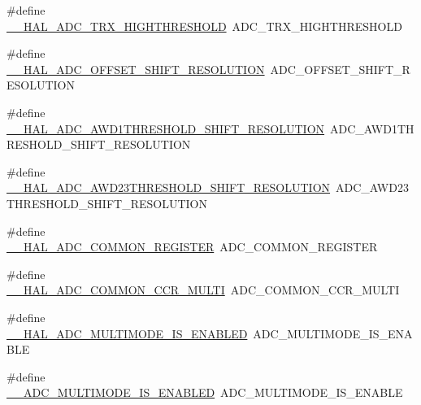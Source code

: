 \begin{DoxyCompactItemize}
\item 
\#define \hyperlink{group___h_a_l___a_d_c___aliased___macros_ga33afa59f288d4671512aed3dfb8f70b7}{\+\_\+\+\_\+\+H\+A\+L\+\_\+\+A\+D\+C\+\_\+\+T\+R\+X\+\_\+\+H\+I\+G\+H\+T\+H\+R\+E\+S\+H\+O\+LD}~A\+D\+C\+\_\+\+T\+R\+X\+\_\+\+H\+I\+G\+H\+T\+H\+R\+E\+S\+H\+O\+LD
\item 
\#define \hyperlink{group___h_a_l___a_d_c___aliased___macros_ga0f83fc077ad488745139c8e24641d437}{\+\_\+\+\_\+\+H\+A\+L\+\_\+\+A\+D\+C\+\_\+\+O\+F\+F\+S\+E\+T\+\_\+\+S\+H\+I\+F\+T\+\_\+\+R\+E\+S\+O\+L\+U\+T\+I\+ON}~A\+D\+C\+\_\+\+O\+F\+F\+S\+E\+T\+\_\+\+S\+H\+I\+F\+T\+\_\+\+R\+E\+S\+O\+L\+U\+T\+I\+ON
\item 
\#define \hyperlink{group___h_a_l___a_d_c___aliased___macros_ga616002cefa3a1ba7af4fa612afd02561}{\+\_\+\+\_\+\+H\+A\+L\+\_\+\+A\+D\+C\+\_\+\+A\+W\+D1\+T\+H\+R\+E\+S\+H\+O\+L\+D\+\_\+\+S\+H\+I\+F\+T\+\_\+\+R\+E\+S\+O\+L\+U\+T\+I\+ON}~A\+D\+C\+\_\+\+A\+W\+D1\+T\+H\+R\+E\+S\+H\+O\+L\+D\+\_\+\+S\+H\+I\+F\+T\+\_\+\+R\+E\+S\+O\+L\+U\+T\+I\+ON
\item 
\#define \hyperlink{group___h_a_l___a_d_c___aliased___macros_ga4038d6abc1b95e035a2a0b51fb999db2}{\+\_\+\+\_\+\+H\+A\+L\+\_\+\+A\+D\+C\+\_\+\+A\+W\+D23\+T\+H\+R\+E\+S\+H\+O\+L\+D\+\_\+\+S\+H\+I\+F\+T\+\_\+\+R\+E\+S\+O\+L\+U\+T\+I\+ON}~A\+D\+C\+\_\+\+A\+W\+D23\+T\+H\+R\+E\+S\+H\+O\+L\+D\+\_\+\+S\+H\+I\+F\+T\+\_\+\+R\+E\+S\+O\+L\+U\+T\+I\+ON
\item 
\#define \hyperlink{group___h_a_l___a_d_c___aliased___macros_ga00ebbedf4015e4538720e7a6dbacce59}{\+\_\+\+\_\+\+H\+A\+L\+\_\+\+A\+D\+C\+\_\+\+C\+O\+M\+M\+O\+N\+\_\+\+R\+E\+G\+I\+S\+T\+ER}~A\+D\+C\+\_\+\+C\+O\+M\+M\+O\+N\+\_\+\+R\+E\+G\+I\+S\+T\+ER
\item 
\#define \hyperlink{group___h_a_l___a_d_c___aliased___macros_ga8bf50f7c58849d4cd141a421d55b148d}{\+\_\+\+\_\+\+H\+A\+L\+\_\+\+A\+D\+C\+\_\+\+C\+O\+M\+M\+O\+N\+\_\+\+C\+C\+R\+\_\+\+M\+U\+L\+TI}~A\+D\+C\+\_\+\+C\+O\+M\+M\+O\+N\+\_\+\+C\+C\+R\+\_\+\+M\+U\+L\+TI
\item 
\#define \hyperlink{group___h_a_l___a_d_c___aliased___macros_ga79f75f2e379c482c38441c050efc7225}{\+\_\+\+\_\+\+H\+A\+L\+\_\+\+A\+D\+C\+\_\+\+M\+U\+L\+T\+I\+M\+O\+D\+E\+\_\+\+I\+S\+\_\+\+E\+N\+A\+B\+L\+ED}~A\+D\+C\+\_\+\+M\+U\+L\+T\+I\+M\+O\+D\+E\+\_\+\+I\+S\+\_\+\+E\+N\+A\+B\+LE
\item 
\#define \hyperlink{group___h_a_l___a_d_c___aliased___macros_gaa5b9fcac48711d597023aecdb11afc51}{\+\_\+\+\_\+\+A\+D\+C\+\_\+\+M\+U\+L\+T\+I\+M\+O\+D\+E\+\_\+\+I\+S\+\_\+\+E\+N\+A\+B\+L\+ED}~A\+D\+C\+\_\+\+M\+U\+L\+T\+I\+M\+O\+D\+E\+\_\+\+I\+S\+\_\+\+E\+N\+A\+B\+LE

\end{DoxyCompactItemize}
